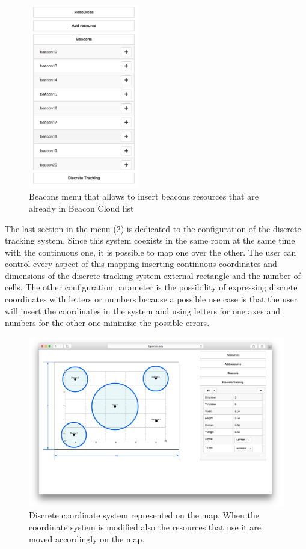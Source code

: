 \begin{figure}
\centering
\includegraphics[width=1.9in]{images/classroom-layout-beacons.png}
\caption{Beacons menu that allows to insert beacons resources that are already in Beacon Cloud list}
\label{fig:classroom_layout_beacons}
\end{figure}

The last section in the menu (\ref{fig:classroom_layout_discrete}) is dedicated to the configuration of the discrete tracking system. Since this system coexists in the same room at the same time with the continuous one, it is possible to map one over the other. The user can control every aspect of this mapping inserting continuous coordinates and dimensions of the discrete tracking system external rectangle and the number of cells. The other configuration parameter is the possibility of expressing discrete coordinates with letters or numbers because a possible use case is that the user will insert the coordinates in the system and using letters for one axes and numbers for the other one minimize the possible errors.

\begin{figure}
\centering
\includegraphics[width=4.5in]{images/classroom-layout-discrete.png}
\caption{Discrete coordinate system represented on the map. When the coordinate system is modified also the resources that use it are moved accordingly on the map.}
\label{fig:classroom_layout_discrete}
\end{figure}

